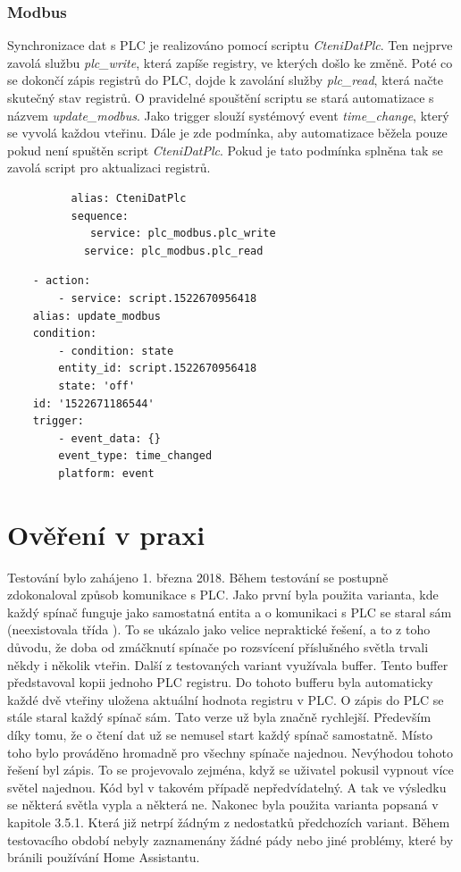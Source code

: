 \documentclass[a4paper,12pt,czech,bibliography=totoc]{scrbook}
\begin{document}
	\subsection{Modbus}
	Synchronizace dat s PLC je realizováno pomocí scriptu \textit{CteniDatPlc}. Ten nejprve zavolá službu \textit{plc\_write}, která zapíše registry, ve kterých došlo ke změně. Poté co se dokončí zápis registrů do PLC, dojde k zavolání služby \textit{plc\_read}, která načte skutečný stav registrů.
\newline
O pravidelné spouštění scriptu se stará automatizace s názvem \textit{update\_modbus}. Jako trigger slouží systémový event \textit{time\_change}, který se vyvolá každou vteřinu. Dále je zde podmínka, aby automatizace běžela pouze pokud není spuštěn script \textit{CteniDatPlc}. Pokud je tato podmínka splněna tak se zavolá script pro aktualizaci registrů.

	\begin{lstlisting}
		  alias: CteniDatPlc
		  sequence:
			 service: plc_modbus.plc_write
		    service: plc_modbus.plc_read
	\end{lstlisting}
	\begin{lstlisting}
	- action:
		- service: script.1522670956418
	alias: update_modbus
	condition:
		- condition: state
		entity_id: script.1522670956418
		state: 'off'
	id: '1522671186544'
	trigger:
		- event_data: {}
		event_type: time_changed
		platform: event
	\end{lstlisting}
	
\chapter{Ověření v praxi}
Testování bylo zahájeno 1. března 2018. Během testování se postupně zdokonaloval způsob komunikace s PLC. Jako první byla použita varianta, kde každý spínač funguje jako samostatná entita a o komunikaci s PLC se staral sám (neexistovala třída ). To se ukázalo jako velice nepraktické řešení, a to z toho důvodu, že doba od zmáčknutí spínače po rozsvícení příslušného světla trvali někdy i několik vteřin. 
\newline
Další z testovaných variant využívala buffer. Tento buffer představoval kopii jednoho PLC registru. Do tohoto bufferu byla automaticky každé dvě vteřiny uložena aktuální hodnota registru v PLC. O zápis do PLC se stále staral každý spínač sám. Tato verze už byla značně rychlejší. Především díky tomu, že o čtení dat už se nemusel start každý spínač samostatně. Místo toho bylo prováděno hromadně pro všechny spínače najednou. Nevýhodou tohoto řešení byl zápis. To se projevovalo zejména, když se uživatel pokusil vypnout více světel najednou. Kód byl v takovém případě nepředvídatelný. A tak ve výsledku se některá světla vypla a některá ne.
\newline
Nakonec byla použita varianta popsaná v kapitole 3.5.1. Která již netrpí žádným z nedostatků předchozích variant.
\newline
Během testovacího období nebyly zaznamenány žádné pády nebo jiné problémy, které by bránili používání Home Assistantu.
\end{document}
